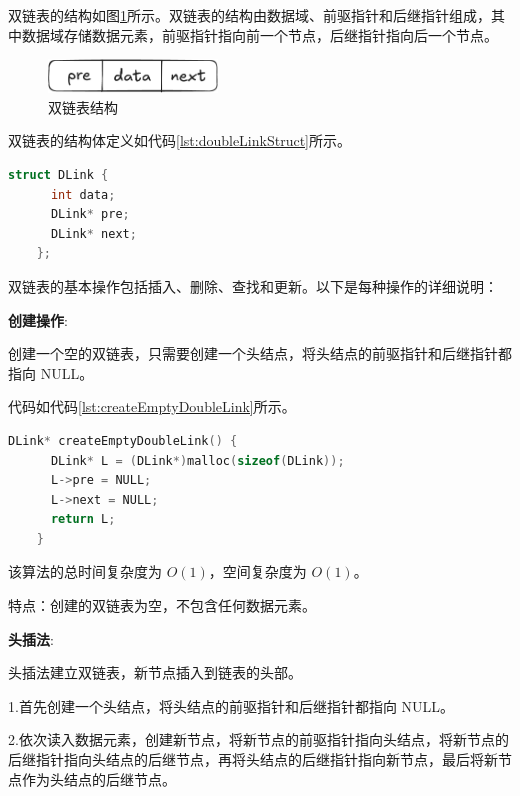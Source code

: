 \documentclass[lang=cn,newtx,10pt,scheme=chinese]{../elegantbook}
\begin{document}
  双链表的结构如图\ref{fig:doubleLinkStruct}所示。双链表的结构由数据域、前驱指针和后继指针组成，其中数据域存储数据元素，前驱指针指向前一个节点，后继指针指向后一个节点。
  \begin{figure}[h]
    \centering
    \includegraphics[width=0.4\textwidth]{./figure/pdf/cropped/doubleLinkStruct.pdf}
    \caption{双链表结构}
    \label{fig:doubleLinkStruct}
  \end{figure}

  双链表的结构体定义如代码\ref{lst:doubleLinkStruct}所示。
  \begin{lstlisting}[language=C++, caption={双链表结构体定义}, label={lst:doubleLinkStruct}]
    struct DLink {
      int data;
      DLink* pre;
      DLink* next;
    };
  \end{lstlisting}

  双链表的基本操作包括插入、删除、查找和更新。以下是每种操作的详细说明：

  \textbf{创建操作}:

  创建一个空的双链表，只需要创建一个头结点，将头结点的前驱指针和后继指针都指向 NULL。

  代码如代码\ref{lst:createEmptyDoubleLink}所示。
  \begin{lstlisting}[language=C++, caption={创建一个空双链表示例代码}, label={lst:createEmptyDoubleLink}]
    DLink* createEmptyDoubleLink() {
      DLink* L = (DLink*)malloc(sizeof(DLink));
      L->pre = NULL;
      L->next = NULL;
      return L;
    }
  \end{lstlisting}
  该算法的总时间复杂度为 $O(1)$，空间复杂度为 $O(1)$。

  特点：创建的双链表为空，不包含任何数据元素。

  \textbf{头插法}:

  头插法建立双链表，新节点插入到链表的头部。

  1.首先创建一个头结点，将头结点的前驱指针和后继指针都指向 NULL。

  2.依次读入数据元素，创建新节点，将新节点的前驱指针指向头结点，将新节点的后继指针指向头结点的后继节点，再将头结点的后继指针指向新节点，最后将新节点作为头结点的后继节点。
\end{document}
